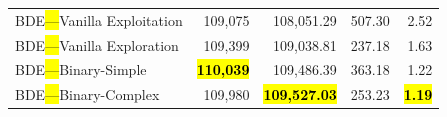 \documentclass[mathematics,article,accept,moreauthors]{Definitions/mdpi}
\begin{document}
\begin{table}[H]
\begin{tabularx}{\textwidth}{lRRRR}
    \midrule
    BDE\hl{---}Vanilla Exploitation  &         109,075 &        108,051.29 & 507.30 &         2.52 \\
    BDE\hl{---}Vanilla Exploration   &         109,399 &        109,038.81 & 237.18 &         1.63 \\
    BDE\hl{---}Binary-Simple         & \textbf{\hl{110,039}} &        109,486.39 & 363.18 &         1.22 \\
    BDE\hl{---}Binary-Complex        &         109,980 & \textbf{\hl{109,527.03}} & 253.23 & \textbf{\hl{1.19}} \\
    \bottomrule
  \end{tabularx}
\end{table}

\vspace{-9pt}

\end{document}
